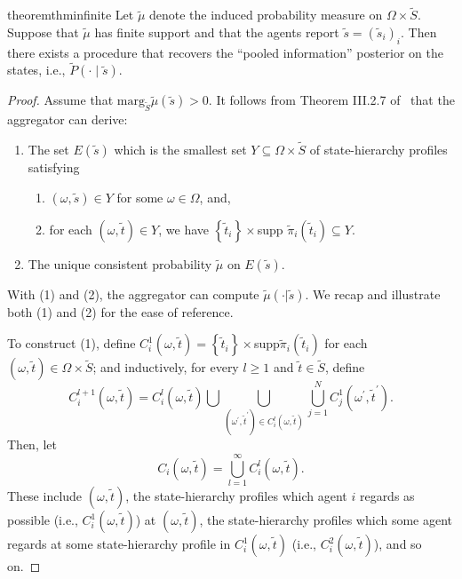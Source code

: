 \documentclass[12pt,reqno]{amsart}
\begin{document}
\begin{restatable}{theorem}{thminfinite}\label{thm:infinite}
Let $\tilde{\mu}$ denote the induced probability measure on $\Omega \times \tilde{S}$. Suppose that $\tilde{\mu}$ has finite support and that the agents report $\tilde{s}=(\tilde{s}_i)_i$. Then there exists a procedure that recovers the ``pooled information'' posterior on the states, i.e., $\tilde{P}(\cdot \mid \tilde{s})$.
\end{restatable}

\begin{proof}
Assume that $\text{marg}_{\tilde{S}}\tilde{\mu}\left( \tilde{s}\right) >0$. It follows from Theorem
III.2.7 of~\cite{mertens2015repeated} that the aggregator can derive:
\begin{enumerate}
    \item  The set $E\left( \tilde{s}\right) $
which is the smallest set $Y\subseteq \Omega \times \tilde{S}$ of
state-hierarchy profiles satisfying
\begin{enumerate}
    \item  $\left( \omega ,\tilde{s}\right) \in
Y$ for some $\omega \in \Omega$, and,
    \item  for each $\left( \omega ,\tilde{t}\right) \in
Y $, we have $\left\{ \tilde{t}_{i}\right\} \times $supp $\tilde{\pi}%
_{i}\left( \tilde{t}_{i}\right) \subseteq Y$.
\end{enumerate}
\item The unique consistent
probability $\tilde{\mu}$ on $E\left( \tilde{s}\right) $.
\end{enumerate}
With (1) and (2),
the aggregator can compute $\tilde{\mu}\left( \cdot |\tilde{s}\right) $. We
recap and illustrate both (1) and (2) for the ease of reference.

To construct (1), define $C_{i}^{1}\left( \omega ,\tilde{t}\right) =\left\{ \tilde{t}%
_{i}\right\} \times $supp$\tilde{\pi}_{i}\left( \tilde{t}_{i}\right) $ for
each $\left( \omega ,\tilde{t}\right) \in \Omega \times \tilde{S}$; and
inductively, for every $l\geq 1$ and $\tilde{t}\in \tilde{S}$, define 
\[
C_{i}^{l+1}\left( \omega ,\tilde{t}\right) =C_{i}^{l}\left( \omega ,\tilde{t}%
\right) \bigcup \bigcup\limits_{\left( \omega ^{\prime },\tilde{t}^{\prime
}\right) \in C_{i}^{l}\left( \omega ,\tilde{t}\right)
}\bigcup\limits_{j=1}^{N}C_{j}^{1}\left( \omega ^{\prime },\tilde{t}^{\prime
}\right) \text{.} 
\]%
Then, let%
\[
C_{i}\left( \omega ,\tilde{t}\right) =\bigcup\limits_{l=1}^{\infty
}C_{i}^{l}\left( \omega ,\tilde{t}\right) \text{.} 
\]%
These include $\left( \omega ,\tilde{t}\right) $, the state-hierarchy
profiles which agent $i$ regards as possible (i.e., $C_{i}^{1}\left( \omega ,%
\tilde{t}\right) $) at $\left( \omega ,\tilde{t}\right) $, the
state-hierarchy profiles which some agent regards at some state-hierarchy
profile in $C_{i}^{1}\left( \omega ,\tilde{t}\right) $ (i.e., $%
C_{i}^{2}\left( \omega ,\tilde{t}\right) $), and so on. 


\end{proof}
\end{document}
